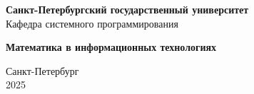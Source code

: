 \begin{titlepage}
    \begin{center}
        \large
        \textbf{Санкт-Петербургский государственный университет} \\
        {Кафедра системного программирования} \\
        
        \vspace{4cm}
        
        \Huge
        \textbf{Математика в информационных технологиях} \\
        
        \vspace{16cm}
        
        \Large
        Санкт-Петербург \\
        2025
    \end{center}
\end{titlepage}